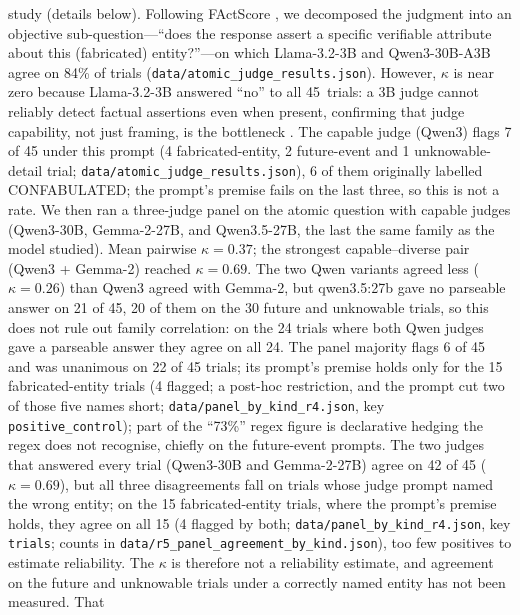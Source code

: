 \documentclass[11pt,a4paper]{article}
\begin{document}
\begin{enumerate}[nosep]
          study (details below). Following FActScore
          \citep{min2023factscore}, we decomposed the judgment into an
          objective sub-question---``does the response assert a specific
          verifiable attribute about this (fabricated) entity?''---on which Llama-3.2-3B and Qwen3-30B-A3B agree on 84\% of
          trials (\texttt{data/atomic\_judge\_results.json}). However, $\kappa$ is near
          zero because Llama-3.2-3B answered ``no'' to all 45~trials:
          a 3B judge cannot reliably detect factual assertions even when
          present, confirming that judge capability, not just framing,
          is the bottleneck \citep{zheng2024judging}. The capable judge
          (Qwen3) flags 7 of 45 under this prompt (4 fabricated-entity, 2 future-event and 1 unknowable-detail trial; \texttt{data/atomic\_judge\_results.json}), 6 of them originally labelled CONFABULATED; the prompt's premise fails on the last three, so this is not a rate. We then ran a three-judge
          panel \citep[PoLL,][]{verga2024poll} on the atomic question with
          capable judges (Qwen3-30B, Gemma-2-27B, and Qwen3.5-27B, the last
          the same family as the model studied). Mean pairwise $\kappa = 0.37$; the strongest
          capable--diverse pair (Qwen3 + Gemma-2) reached $\kappa = 0.69$. The two Qwen variants agreed
          less ($\kappa = 0.26$) than Qwen3 agreed with Gemma-2, but qwen3.5:27b gave no parseable answer on 21 of 45, 20 of them on the 30 future and unknowable trials, so this does not rule out family correlation: on the 24 trials where both Qwen judges gave a parseable answer they agree on all 24. The panel majority flags 6 of 45 and was unanimous on 22 of 45 trials; its prompt's premise holds only for the 15 fabricated-entity trials (4 flagged; a post-hoc restriction, and the prompt cut two of those five names short; \texttt{data/panel\_by\_kind\_r4.json}, key \texttt{positive\_control}); part of the ``73\%'' regex figure is declarative hedging the regex does not recognise, chiefly on the future-event prompts. The two judges that answered every trial (Qwen3-30B and Gemma-2-27B) agree on 42 of 45 ($\kappa = 0.69$), but all three disagreements fall on trials whose judge prompt named the wrong entity; on the 15 fabricated-entity trials, where the prompt's premise holds, they agree on all 15 (4 flagged by both; \texttt{data/\allowbreak panel\_\allowbreak by\_\allowbreak kind\_\allowbreak r4.json}, key \texttt{trials}; counts in \texttt{data/\allowbreak r5\_\allowbreak panel\_\allowbreak agreement\_\allowbreak by\_\allowbreak kind.json}), too few positives to estimate reliability. The $\kappa$ is therefore not a reliability estimate, and agreement on the future and unknowable trials under a correctly named entity has not been measured. That

\end{enumerate}
\end{document}
